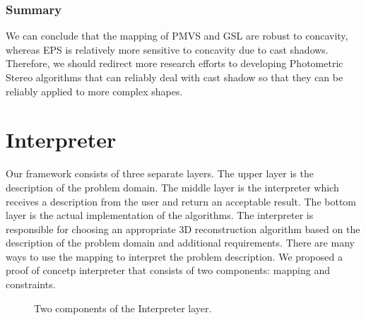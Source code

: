 \subsubsection{Summary}
We can conclude that the mapping of PMVS and GSL are robust to concavity, whereas EPS is relatively more sensitive to concavity due to cast shadows. Therefore, we should redirect more research efforts to developing Photometric Stereo algorithms that can reliably deal with cast shadow so that they can be reliably applied to more complex shapes.


\section{Interpreter}
Our framework consists of three separate layers. The upper layer is the description of the problem domain. The middle layer is the interpreter which receives a description from the user and return an acceptable result. The bottom layer is the actual implementation of the algorithms. The interpreter is responsible for choosing an appropriate 3D reconstruction algorithm based on the description of the problem domain and additional requirements. There are many ways to use the mapping to interpret the problem description. We proposed a proof of concetp interpreter that consists of two components: mapping and constraints.
\begin{figure}[!htbp]
\centering
{}
\caption{Two components of the Interpreter layer.}
\label{fig:interpreter_layer}
\end{figure}


